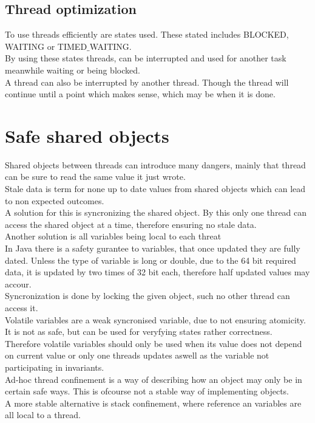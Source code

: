 \documentclass[12pt, a4paper]{article}
\begin{document}
		\subsection{Thread optimization}
			To use threads efficiently are states used. These stated includes BLOCKED, WAITING or TIMED$\_$WAITING.\\
			By using these states threads, can be interrupted and used for another task meanwhile waiting or being blocked.\\
			A thread can also be interrupted by another thread. Though the thread will continue until a point which makes sense, which may be when it is done.
	\section{Safe shared objects}
		Shared objects between threads can introduce many dangers, mainly that thread can be sure to read the same value it just wrote.\\
		Stale data is term for none up to date values from shared objects which can lead to non expected outcomes.\\
		A solution for this is syncronizing the shared object. By this only one thread can access the shared object at a time, therefore ensuring no stale data.\\
		Another solution is all variables being local to each threat\\[4mm]
		In Java there is a safety gurantee to variables, that once updated they are fully dated. Unless the type of variable is long or double, due to the 64 bit required data, it is updated by two times of 32 bit each, therefore half updated values may accour.\\
		Syncronization is done by locking the given object, such no other thread can access it. \\[4mm]
		Volatile variables are a weak syncronised variable, due to not ensuring atomicity. It is not as safe, but can be used for veryfying states rather correctness.\\
		Therefore volatile variables should only be used when its value does not depend on current value or only one threads updates aswell as the variable not participating in invariants.\\[4mm]
		Ad-hoc thread confinement is a way of describing how an object may only be in certain safe ways. This is ofcourse not a stable way of implementing objects.\\
		A more stable alternative is stack confinement, where reference an variables are all local to a thread.\\
\end{document}
